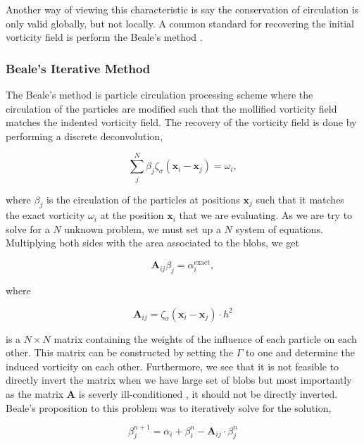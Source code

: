 Another way of viewing this characteristic is say the conservation of circulation is only valid globally, but not locally. A common standard for recovering the initial vorticity field is perform the Beale's method \cite{Beale1988}.

\subsubsection*{Beale's Iterative Method}

The Beale's method is particle circulation processing scheme where the circulation of the particles are modified such that the mollified vorticity field matches the indented vorticity field. The recovery of the vorticity field is done by performing a discrete deconvolution,

	\begin{equation}
	\sum_j^N \beta_j \zeta_{\sigma}\left(\mathbf{x}_i-\mathbf{x}_j\right) = \omega_i,
		\end{equation}

where $\beta_j$ is the circulation of the particles at positions $\mathbf{x}_j$ such that it matches the exact vorticity $\omega_i$ at the position $\mathbf{x}_i$ that we are evaluating.  As we are try to solve for a $N$ unknown problem, we must set up a $N$ system of equations. Multiplying both sides with the area associated to the blobs, we get

	\begin{equation}
	\mathbf{A}_{ij} \beta_j = \alpha_i^{\mathrm{exact}},
	\end{equation}
	
where

	\begin{equation}
	\mathbf{A}_{ij} = \zeta_{\sigma}\left(\mathbf{x}_i - \mathbf{x}_j\right) \cdot h^2
	\end{equation}

is a $N \times N$ matrix containing the weights of the influence of each particle on each other. This matrix can be constructed by setting the $\Gamma$ to one and determine the induced vorticity on each other. Furthermore, we see that it is not feasible to directly invert the matrix when we have large set of blobs but most importantly as the matrix $\mathbf{A}$ is severly ill-conditioned \cite{Speck2011a}, it should not be directly inverted. Beale's proposition to this problem was to iteratively solve for the solution,

	\begin{equation}
	\beta_{j}^{n+1} = \alpha_i + \beta_i^n - \mathbf{A}_{ij}\cdot\beta_j^n
	\end{equation}
	
